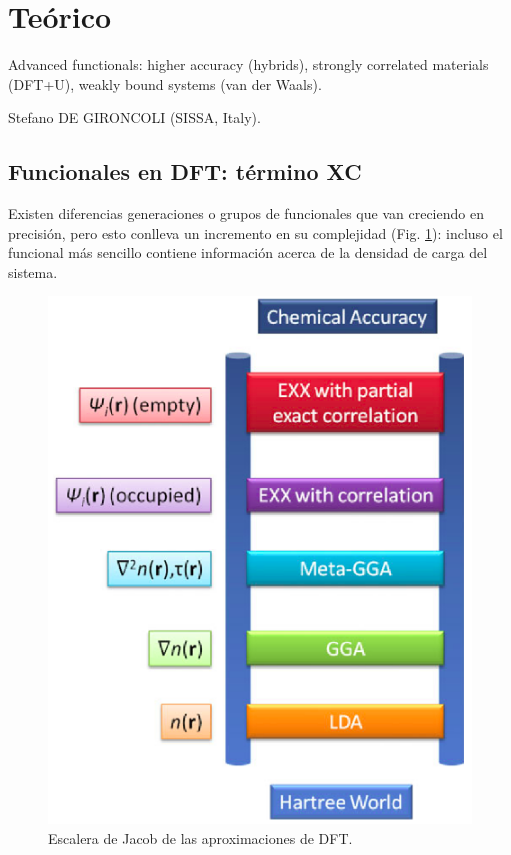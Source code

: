 \section{Teórico}

   Advanced functionals: higher accuracy (hybrids), strongly correlated materials (DFT+U), weakly bound systems (van der Waals).

   Stefano DE GIRONCOLI (SISSA, Italy).

\subsection{Funcionales en DFT: término XC}

  Existen diferencias generaciones o grupos de funcionales que van creciendo en precisión, pero esto conlleva un incremento en su complejidad (Fig. \ref{fig:jacob}): incluso el funcional más sencillo contiene información acerca de la densidad de carga del sistema.

  \begin{figure}[H]
      \centering
      \includegraphics[scale = 0.5]{figs/D4/Jacob.png}
      \caption{Escalera de Jacob de las aproximaciones de DFT.}
      \label{fig:jacob}
  \end{figure}


